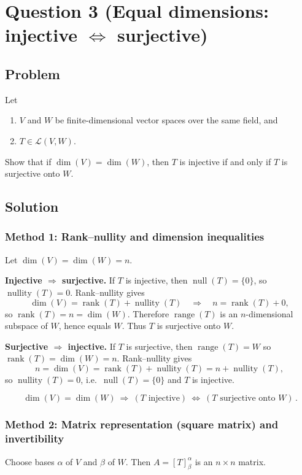 \documentclass[12pt]{article}
\newcommand{\cL}{\mathcal{L}}
\DeclareMathOperator{\Range}{range}
\DeclareMathOperator{\Rank}{rank}
\DeclareMathOperator{\Nullity}{nullity}
\DeclareMathOperator{\Null}{null}
\begin{document}
\newpage
\section{Question 3 (Equal dimensions: injective $\Leftrightarrow$ surjective)}
\subsection{Problem}
Let
\begin{enumerate}[label=(\roman*)]
\item $V$ and $W$ be finite-dimensional vector spaces over the same field, and
\item $T\in\cL(V,W)$.
\end{enumerate}
Show that if $\dim(V)=\dim(W)$, then $T$ is injective if and only if $T$ is surjective onto $W$.

\subsection{Solution}

\subsubsection{Method 1: Rank--nullity and dimension inequalities}
Let $\dim(V)=\dim(W)=n$.

\medskip
\noindent\textbf{Injective $\Rightarrow$ surjective.}
If $T$ is injective, then $\Null(T)=\{0\}$, so $\Nullity(T)=0$.
Rank--nullity gives
\[
\dim(V)=\Rank(T)+\Nullity(T)\quad\Rightarrow\quad n=\Rank(T)+0,
\]
so $\Rank(T)=n=\dim(W)$. Therefore $\Range(T)$ is an $n$-dimensional subspace of $W$, hence equals $W$.
Thus $T$ is surjective onto $W$.

\medskip
\noindent\textbf{Surjective $\Rightarrow$ injective.}
If $T$ is surjective, then $\Range(T)=W$ so $\Rank(T)=\dim(W)=n$.
Rank--nullity gives
\[
n=\dim(V)=\Rank(T)+\Nullity(T)=n+\Nullity(T),
\]
so $\Nullity(T)=0$, i.e.\ $\Null(T)=\{0\}$ and $T$ is injective.

\[
\boxed{\,\dim(V)=\dim(W)\ \Longrightarrow\ (T\text{ injective})\ \Longleftrightarrow\ (T\text{ surjective onto }W)\,}.
\]

\subsubsection{Method 2: Matrix representation (square matrix) and invertibility}
Choose bases $\alpha$ of $V$ and $\beta$ of $W$. Then $A=[T]_\beta^\alpha$ is an $n\times n$ matrix.
\end{document}
